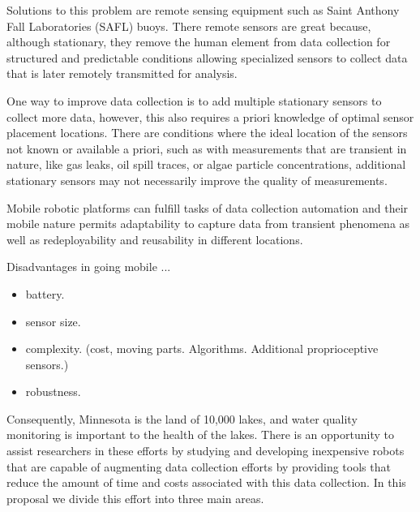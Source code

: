 Solutions to this problem are remote sensing equipment such as Saint Anthony Fall Laboratories (SAFL) buoys. There remote sensors are great because, although stationary, they remove the human element from data collection for structured and predictable conditions allowing specialized sensors to collect data that is later remotely transmitted for analysis. 

One way to improve data collection is to add multiple stationary sensors to collect more data, however, this also requires a priori knowledge of optimal sensor placement locations. There are conditions where the ideal location of the sensors not known or available a priori, such as with measurements that are transient in nature, like gas leaks, oil spill traces, or algae particle concentrations, additional stationary sensors may not necessarily improve the quality of measurements. 

Mobile robotic platforms can fulfill tasks of data collection automation and their mobile nature permits adaptability to capture data from transient phenomena as well as redeployability and reusability in different locations. 

Disadvantages in going mobile ... 
\begin{itemize}
    \item battery.
    \item sensor size.
    \item complexity. (cost, moving parts. Algorithms. Additional proprioceptive sensors.)
    \item robustness. 
\end{itemize}



Consequently, Minnesota is the land of 10,000 lakes, and water quality monitoring is important to the health of the lakes. There is an opportunity to assist researchers in these efforts by studying and developing inexpensive robots that are capable of augmenting data collection efforts by providing tools that reduce the amount of time and costs associated with this data collection. In this proposal we divide this effort into three main areas. 

